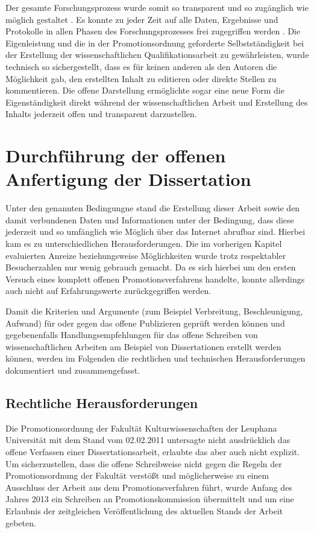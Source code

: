 Der gesamte Forschungsprozess wurde somit so transparent und so zugänglich wie möglich gestaltet \cite{Scheliga_2014}. Es konnte zu jeder Zeit auf alle Daten, Ergebnisse und Protokolle in allen Phasen des Forschungsprozesses frei zugegriffen werden \cite{RIN_2010_open_research}. Die Eigenleistung und die in der Promotionsordnung geforderte \cite{promotionsordnung_leuphana_kuwi_2011} Selbstständigkeit bei der Erstellung der wissenschaftlichen Qualifikationsarbeit zu gewährleisten, wurde technisch so sichergestellt, dass es für keinen anderen als den Autoren die Möglichkeit gab, den erstellten Inhalt zu editieren oder direkte Stellen zu kommentieren. Die offene Darstellung ermöglichte sogar eine neue Form die Eigenständigkeit direkt während der wissenschaftlichen Arbeit und Erstellung des Inhalts jederzeit offen und transparent darzustellen.

\section{Durchführung der offenen Anfertigung der Dissertation}

Unter den genannten Bedingungne stand die Erstellung dieser Arbeit sowie den damit verbundenen Daten und Informationen unter der Bedingung, dass diese jederzeit und so umfänglich wie Möglich über das Internet abrufbar sind. Hierbei kam es zu unterschiedlichen Herausforderungen. Die im vorherigen Kapitel evaluierten Anreize beziehungsweise Möglichkeiten wurde trotz respektabler Besucherzahlen nur wenig gebrauch gemacht. Da es sich hierbei um den ersten Versuch eines komplett offenen Promotionsverfahrens handelte, konnte allerdings auch nicht auf Erfahrungswerte zurückgegriffen werden.

Damit die Kriterien und Argumente (zum Beispiel Verbreitung, Beschleunigung, Aufwand) für oder gegen das offene Publizieren geprüft werden können und gegebenenfalls Handlungsempfehlungen für das offene Schreiben von wissenschaftlichen Arbeiten am Beispiel von Dissertationen erstellt werden können, werden im Folgenden die rechtlichen und technischen Herausforderungen dokumentiert und zusammengefasst.

\subsection{Rechtliche Herausforderungen}

Die Promotionsordnung der Fakultät Kulturwissenschaften der Leuphana Universität mit dem Stand vom 02.02.2011 \cite{promotionsordnung_leuphana_kuwi_2011} untersagte nicht ausdrücklich das offene Verfassen einer Dissertationsarbeit, erlaubte das aber auch nicht explizit. Um sicherzustellen, dass die offene Schreibweise nicht gegen die Regeln der Promotionsordnung der Fakultät verstößt und möglicherweise zu einem Ausschluss der Arbeit aus dem Promotionsverfahren führt, wurde Anfang des Jahres 2013 ein Schreiben an Promotionskommission übermittelt und um eine Erlaubnis der zeitgleichen Veröffentlichung des aktuellen Stands der Arbeit gebeten.

